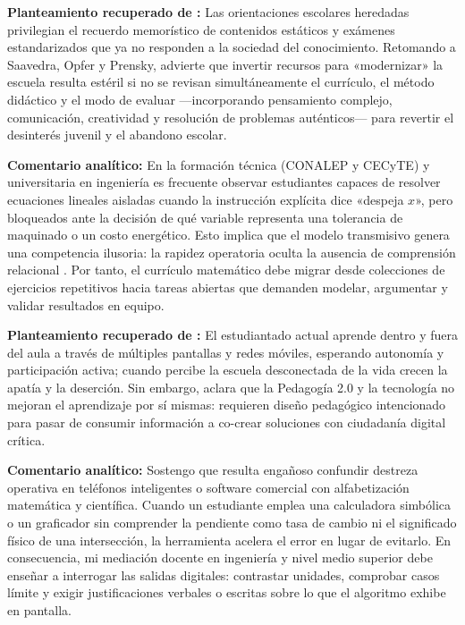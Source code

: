 \documentclass[spanish,letterpaper,oneside]{article}
\begin{document}
\begin{tcolorbox}[colback=iiiepePale,colframe=iiiepeNavy,title=\textbf{Idea 1 · No basta «corregir el sistema»: urge transformar contenido, pedagogía y evaluación},breakable]
\textbf{Planteamiento recuperado de \citet{scott2015futuro}:} Las orientaciones escolares heredadas privilegian el recuerdo memorístico de contenidos estáticos y exámenes estandarizados que ya no responden a la sociedad del conocimiento. Retomando a Saavedra, Opfer y Prensky, \citet{scott2015futuro} advierte que invertir recursos para «modernizar» la escuela resulta estéril si no se revisan simultáneamente el currículo, el método didáctico y el modo de evaluar —incorporando pensamiento complejo, comunicación, creatividad y resolución de problemas auténticos— para revertir el desinterés juvenil y el abandono escolar.

\medskip
\textbf{Comentario analítico:} En la formación técnica (CONALEP y CECyTE) y universitaria en ingeniería es frecuente observar estudiantes capaces de resolver ecuaciones lineales aisladas cuando la instrucción explícita dice «despeja $x$», pero bloqueados ante la decisión de qué variable representa una tolerancia de maquinado o un costo energético. Esto implica que el modelo transmisivo genera una competencia ilusoria: la rapidez operatoria oculta la ausencia de comprensión relacional \citep{sawyer2008optimizing}. Por tanto, el currículo matemático debe migrar desde colecciones de ejercicios repetitivos hacia tareas abiertas que demanden modelar, argumentar y validar resultados en equipo.
\end{tcolorbox}

\begin{tcolorbox}[colback=iiiepeMint,colframe=iiiepeAqua!80!black,title=\textbf{Idea 2 · El nuevo aprendiz conectado, Pedagogía 2.0 y ciudadanía digital con mediación docente},breakable]
\textbf{Planteamiento recuperado de \citet{scott2015futuro}:} El estudiantado actual aprende dentro y fuera del aula a través de múltiples pantallas y redes móviles, esperando autonomía y participación activa; cuando percibe la escuela desconectada de la vida crecen la apatía y la deserción. Sin embargo, \citet{scott2015futuro} aclara que la Pedagogía 2.0 y la tecnología no mejoran el aprendizaje por sí mismas: requieren diseño pedagógico intencionado para pasar de consumir información a co-crear soluciones con ciudadanía digital crítica.

\medskip
\textbf{Comentario analítico:} Sostengo que resulta engañoso confundir destreza operativa en teléfonos inteligentes o software comercial con alfabetización matemática y científica. Cuando un estudiante emplea una calculadora simbólica o un graficador sin comprender la pendiente como tasa de cambio ni el significado físico de una intersección, la herramienta acelera el error en lugar de evitarlo. En consecuencia, mi mediación docente en ingeniería y nivel medio superior debe enseñar a interrogar las salidas digitales: contrastar unidades, comprobar casos límite y exigir justificaciones verbales o escritas sobre lo que el algoritmo exhibe en pantalla.
\end{tcolorbox}
\end{document}
